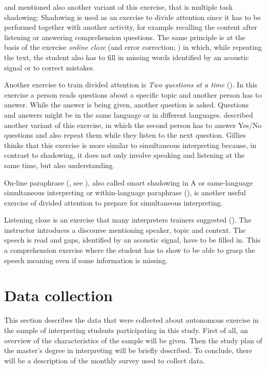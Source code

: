\documentclass[output=paper]{../langscibook}
\begin{document}
\citet{Schewda_Nicholson1990} and \citet{TonelliRiccardi1995} mentioned also another variant of this exercise, that is multiple task shadowing: Shadowing is used as an exercise to divide attention since it has to be performed together with another activity, for example recalling the content after listening or answering comprehension questions. The same principle is at the basis of the exercise \emph{online cloze} (and error correction; \citealt{Kalina1992,SettonDawrant2016b}) in which, while repeating the text, the student also has to fill in missing words identified by an acoustic signal or to correct mistakes.

Another exercise to train divided attention is \textit{Two questions at a time} (\citealt{Kalina1992,Gillies2013}). In this exercise a person reads questions about a specific topic and another person has to answer. While the answer is being given, another question is asked. Questions and answers might be in the same language or in different languages. \citet{Gillies2013} described another variant of this exercise, in which the second person has to answer Yes/No questions and also repeat them while they listen to the next question. Gillies thinks that this exercise is more similar to simultaneous interpreting because, in contrast to shadowing, it does not only involve speaking and listening at the same time, but also understanding.

On-line paraphrase (\citealt{RussoPippa2004}, see ), also called smart shadowing in A or same-language simultaneous interpreting or within-language paraphrase (\citealt{SettonDawrant2016a}), is another useful exercise of divided attention to prepare for simultaneous interpreting.

Listening cloze is an exercise that many interpreters trainers suggested (\citealt{vanDam1989,Kalina1992,PadillaBenitez2002,AndresBodenFuchs2015,SettonDawrant2016b}). The instructor introduces a discourse mentioning speaker, topic and context. The speech is read and gaps, identified by an acoustic signal, have to be filled in. This a comprehension exercise where the student has to show to be able to grasp the speech meaning even if some information is missing.


\section{Data collection}


This section describes the data that were collected about autonomous exercise in the sample of interpreting students participating in this study. First of all, an overview of the characteristics of the sample will be given. Then the study plan of the master’s degree in interpreting will be briefly described. To conclude, there will be a description of the monthly survey used to collect data.
\end{document}
